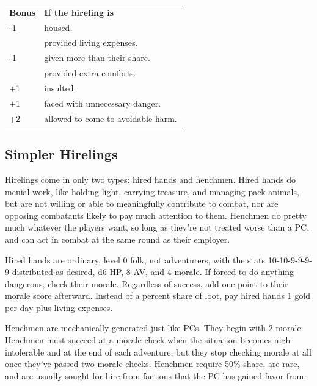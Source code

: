 \documentclass[twoside]{article}
\begin{document}
\bigbreak

\begin{center}
\noindent\begin{tabular}{>{\centering\arraybackslash}p{}p{}}
\textbf{Bonus}&\textbf{If the hireling is}\\
\rowcolor[gray]{0.75}-1&housed.\\
-1&provided living expenses.\\
\rowcolor[gray]{0.75}-1&given more than their share.\\
-1&provided extra comforts.\\
\rowcolor[gray]{0.75}+1&insulted.\\
+1&faced with unnecessary danger.\\
\rowcolor[gray]{0.75}+2&allowed to come to avoidable harm.\\
\end{tabular}
\end{center}

\subsection*{Simpler Hirelings}

Hirelings come in only two types: hired hands and henchmen. Hired hands do menial work, like holding light, carrying treasure, and managing pack animals, but are not willing or able to meaningfully contribute to combat, nor are opposing combatants likely to pay much attention to them. Henchmen do pretty much whatever the players want, so long as they're not treated worse than a PC, and can act in combat at the same round as their employer.

\bigbreak

Hired hands are ordinary, level 0 folk, not adventurers, with the stats 10-10-9-9-9-9 distributed as desired, d6 HP, 8 AV, and 4 morale. If forced to do anything dangerous, check their morale. Regardless of success, add one point to their morale score afterward. Instead of a percent share of loot, pay hired hands 1 gold per day plus living expenses.

\bigbreak

Henchmen are mechanically generated just like PCs. They begin with 2 morale. Henchmen must succeed at a morale check when the situation becomes nigh-intolerable and at the end of each adventure, but they stop checking morale at all once they've passed two morale checks. Henchmen require 50\% share, are rare, and are usually sought for hire from factions that the PC has gained favor from.
\end{document}

